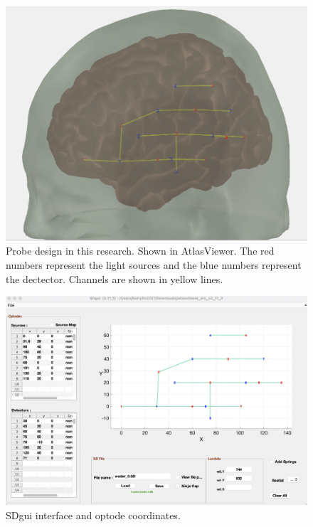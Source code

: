 \begin{figure}[H]
  \centering
    \includegraphics[scale=.35]{bilder/atlas_probe.png}
  \caption{Probe design in this research. Shown in AtlasViewer. The red numbers represent the light sources and the blue numbers represent the dectector. Channels are shown in yellow lines.}
  \label{fig:somesignal}
\end{figure}

\begin{figure}[H]
  \centering
    \includegraphics[scale=.35]{bilder/SDgui.png}
  \caption{SDgui interface and optode coordinates.}
  \label{fig:somesignal}
\end{figure}

